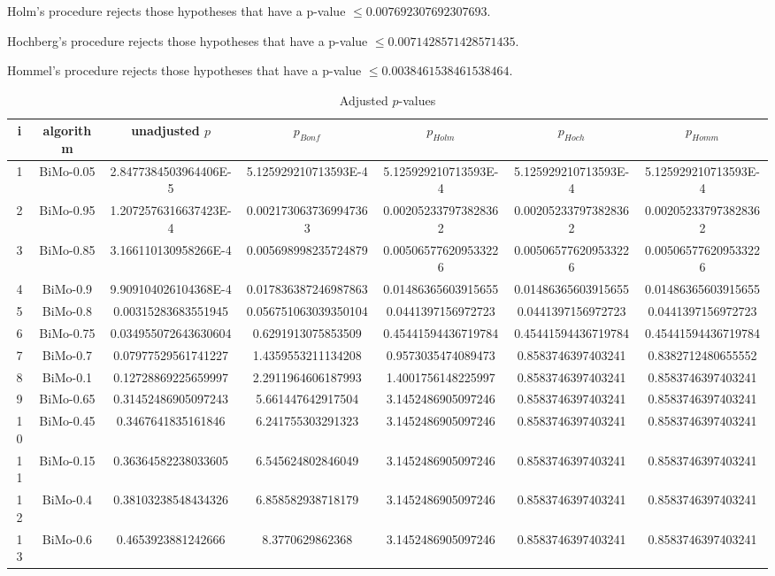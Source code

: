 \documentclass[a4paper,10pt]{article}
\begin{document}
\begin{landscape}
Holm's procedure rejects those hypotheses that have a p-value $\le0.007692307692307693$.


Hochberg's procedure rejects those hypotheses that have a p-value $\le0.0071428571428571435$.


Hommel's procedure rejects those hypotheses that have a p-value $\le0.0038461538461538464$.


\begin{table}[!htp]
\centering\tiny
\caption{Adjusted $p$-values}
\begin{tabular}{ccccccc}
i&algorithm&unadjusted $p$&$p_{Bonf}$&$p_{Holm}$&$p_{Hoch}$&$p_{Homm}$\\
\hline
1&BiMo-0.05&2.8477384503964406E-5&5.125929210713593E-4&5.125929210713593E-4&5.125929210713593E-4&5.125929210713593E-4\\
2&BiMo-0.95&1.2072576316637423E-4&0.0021730637369947363&0.002052337973828362&0.002052337973828362&0.002052337973828362\\
3&BiMo-0.85&3.166110130958266E-4&0.005698998235724879&0.005065776209533226&0.005065776209533226&0.005065776209533226\\
4&BiMo-0.9&9.909104026104368E-4&0.017836387246987863&0.01486365603915655&0.01486365603915655&0.01486365603915655\\
5&BiMo-0.8&0.00315283683551945&0.056751063039350104&0.0441397156972723&0.0441397156972723&0.0441397156972723\\
6&BiMo-0.75&0.034955072643630604&0.6291913075853509&0.45441594436719784&0.45441594436719784&0.45441594436719784\\
7&BiMo-0.7&0.07977529561741227&1.4359553211134208&0.9573035474089473&0.8583746397403241&0.8382712480655552\\
8&BiMo-0.1&0.12728869225659997&2.2911964606187993&1.4001756148225997&0.8583746397403241&0.8583746397403241\\
9&BiMo-0.65&0.31452486905097243&5.661447642917504&3.1452486905097246&0.8583746397403241&0.8583746397403241\\
10&BiMo-0.45&0.3467641835161846&6.241755303291323&3.1452486905097246&0.8583746397403241&0.8583746397403241\\
11&BiMo-0.15&0.36364582238033605&6.545624802846049&3.1452486905097246&0.8583746397403241&0.8583746397403241\\
12&BiMo-0.4&0.38103238548434326&6.858582938718179&3.1452486905097246&0.8583746397403241&0.8583746397403241\\
13&BiMo-0.6&0.4653923881242666&8.3770629862368&3.1452486905097246&0.8583746397403241&0.8583746397403241\\

\end{tabular}
\end{table}
\end{landscape}
\end{document}
